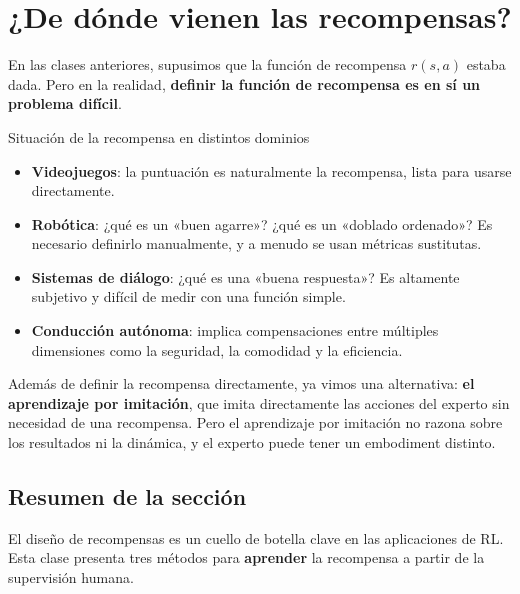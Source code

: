 \section{¿De dónde vienen las recompensas?}

En las clases anteriores, supusimos que la función de recompensa $r(s, a)$ estaba dada. Pero en la realidad, \textbf{definir la función de recompensa es en sí un problema difícil}.

\begin{knowledgebox}{Situación de la recompensa en distintos dominios}
\begin{itemize}
    \item \textbf{Videojuegos}: la puntuación es naturalmente la recompensa, lista para usarse directamente.
    \item \textbf{Robótica}: ¿qué es un «buen agarre»? ¿qué es un «doblado ordenado»? Es necesario definirlo manualmente, y a menudo se usan métricas sustitutas.
    \item \textbf{Sistemas de diálogo}: ¿qué es una «buena respuesta»? Es altamente subjetivo y difícil de medir con una función simple.
    \item \textbf{Conducción autónoma}: implica compensaciones entre múltiples dimensiones como la seguridad, la comodidad y la eficiencia.
\end{itemize}
\end{knowledgebox}

Además de definir la recompensa directamente, ya vimos una alternativa: \textbf{el aprendizaje por imitación}, que imita directamente las acciones del experto sin necesidad de una recompensa. Pero el aprendizaje por imitación no razona sobre los resultados ni la dinámica, y el experto puede tener un embodiment distinto.

\subsection{Resumen de la sección}

El diseño de recompensas es un cuello de botella clave en las aplicaciones de RL. Esta clase presenta tres métodos para \textbf{aprender} la recompensa a partir de la supervisión humana.

